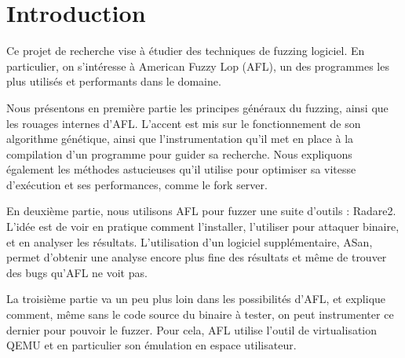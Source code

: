 \chapter*{Introduction}

Ce projet de recherche vise à étudier des techniques de fuzzing logiciel. En
particulier, on s'intéresse à American Fuzzy Lop (AFL), un des programmes les
plus utilisés et performants dans le domaine.

Nous présentons en première partie les principes généraux du fuzzing, ainsi que
les rouages internes d'AFL. L'accent est mis sur le fonctionnement de son
algorithme génétique, ainsi que l'instrumentation qu'il met en place à la
compilation d'un programme pour guider sa recherche. Nous expliquons également
les méthodes astucieuses qu'il utilise pour optimiser sa vitesse d'exécution
et ses performances, comme le fork server.

En deuxième partie, nous utilisons AFL pour fuzzer une suite d'outils :
Radare2. L'idée est de voir en pratique comment l'installer, l'utiliser
pour attaquer binaire, et en analyser les résultats.
L'utilisation d'un logiciel supplémentaire, ASan, permet d'obtenir une
analyse encore plus fine des résultats et même de trouver des bugs qu'AFL ne
voit pas.

La troisième partie va un peu plus loin dans les possibilités d'AFL, et
explique comment, même sans le code source du binaire à tester, on peut
instrumenter ce dernier pour pouvoir le fuzzer. Pour cela, AFL utilise l'outil
de virtualisation QEMU et en particulier son émulation en espace utilisateur.

